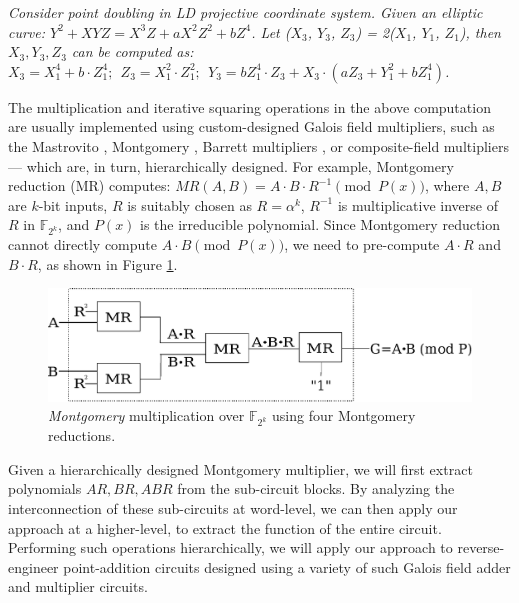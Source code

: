 \begin{Example}
{\it 
Consider point doubling in LD projective coordinate system. Given an
elliptic curve: $Y^2 + XYZ = X^3Z + aX^2Z^2 + bZ^4$.  
Let  ($X_3$, $Y_3$, $Z_3$) = 2($X_1$, $Y_1$, $Z_1$), then $X_3, Y_3,
Z_3$ can be computed as: $X_3 = X_1^4 + b \cdot Z_1^4; ~~Z_3 = X_1^2
\cdot Z_1^2; ~~Y_3 = b Z_1^4 \cdot Z_3 + X_3 \cdot (aZ_3 + Y_1^2 +
bZ_1^4 )$. 
}
\end{Example}

The multiplication and iterative squaring operations in the above
computation are usually implemented using custom-designed Galois field
multipliers, such as the Mastrovito \cite{mastro:1989}, Montgomery
\cite{acar:1998}, Barrett multipliers \cite{Knezevic:2008}, or
composite-field multipliers \cite{cfmulti:1996} --- which are, in
turn, hierarchically designed.  For example, Montgomery reduction (MR)
computes: $MR(A,B)=A\cdot B \cdot R^{-1} \pmod {P(x)}$, 
where $A,B$ are $k$-bit inputs, $R$ is suitably chosen as
$R={\alpha}^k$, $R^{-1}$ is multiplicative inverse of $R$ in
${\mathbb{F}}_{2^k}$, and $P(x)$ is the irreducible polynomial.
Since Montgomery reduction cannot directly compute $A\cdot B \pmod
{P(x)}$, we need to pre-compute $A\cdot R$ and $B\cdot R$, as shown in
Figure \ref{fig:mm4}.   

\begin{figure}[hbt]
	\begin{center}
	\includegraphics[scale=0.4]{new_mmcircuit.eps}
	\end{center}
	\caption{{\it Montgomery} multiplication over $\mathbb{F}_{2^k}$
          using four Montgomery reductions.}
	\label{fig:mm4}
\end{figure}

Given a hierarchically designed Montgomery multiplier, we will first
extract polynomials $AR, BR, ABR$ from the sub-circuit blocks. By
analyzing the interconnection of these sub-circuits at word-level, we
can then apply our approach at a higher-level, to extract the function
of the entire circuit. Performing such operations hierarchically, we
will apply our approach to reverse-engineer point-addition circuits
designed using a variety of such Galois field adder and multiplier
circuits.  
